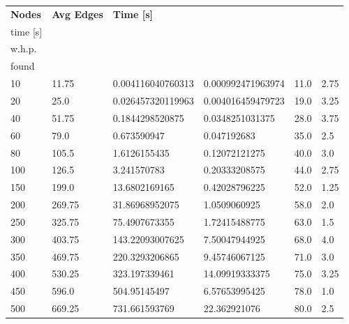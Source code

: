 \begin{longtable}{llllll}
  \textbf{Nodes} & \textbf{Avg Edges} & \textbf{Time {[}s{]}} & \textbf{\begin{tabular}[c]{@{}l@{}}Discovery\\ time {[}s{]}\end{tabular}} & \textbf{\begin{tabular}[c]{@{}l@{}}Avg rep\\ w.h.p.\end{tabular}} & \textbf{\begin{tabular}[c]{@{}l@{}}Avg mincut\\ found\end{tabular}} \\
  \endhead
  10 & 11.75 & 0.004116040760313 & 0.000992471963974 & 11.0 & 2.75 \\
  20 & 25.0 & 0.026457320119963 & 0.004016459479723 & 19.0 & 3.25 \\
  40 & 51.75 & 0.1844298520875 & 0.0348251031375 & 28.0 & 3.75 \\
  60 & 79.0 & 0.673590947 & 0.047192683 & 35.0 & 2.5 \\
  80 & 105.5 & 1.6126155435 & 0.12072121275 & 40.0 & 3.0 \\
  100 & 126.5 & 3.241570783 & 0.20333208575 & 44.0 & 2.75 \\
  150 & 199.0 & 13.6802169165 & 0.42028796225 & 52.0 & 1.25 \\
  200 & 269.75 & 31.86968952075 & 1.0509060925 & 58.0 & 2.0 \\
  250 & 325.75 & 75.4907673355 & 1.72415488775 & 63.0 & 1.5 \\
  300 & 403.75 & 143.22093007625 & 7.50047944925 & 68.0 & 4.0 \\
  350 & 469.75 & 220.3293206865 & 9.45746067125 & 71.0 & 3.0 \\
  400 & 530.25 & 323.197339461 & 14.09919333375 & 75.0 & 3.25 \\
  450 & 596.0 & 504.95145497 & 6.57653995425 & 78.0 & 1.0 \\
  500 & 669.25 & 731.661593769 & 22.362921076 & 80.0 & 2.5
  \end{longtable}

